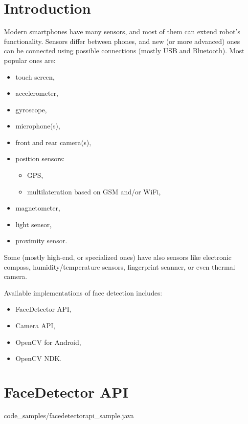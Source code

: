 \documentclass[openany]{mgr} %
\begin{document}
\section{Introduction}
Modern smartphones have many sensors, and most of them can extend robot's
functionality. Sensors differ between phones, and new (or more advanced) ones can
be connected using possible connections (mostly USB and Bluetooth).
Most popular ones are:
\begin{itemize}
  \item touch screen,
  \item accelerometer,
  \item gyroscope,
  \item microphone(s),
  \item front and rear camera(s),
  \item position sensors:
  \begin{itemize}
    \item GPS,
    \item multilateration based on GSM and/or WiFi,
  \end{itemize}
  \item magnetometer,
  \item light sensor,
  \item proximity sensor.
\end{itemize}
Some (mostly high-end, or specialized ones) have also sensors like electronic
compass, humidity/temperature sensors, fingerprint scanner, or even thermal
camera.

Available implementations of face detection includes:
\begin{itemize}
  \item FaceDetector API,
  \item Camera API,
  \item OpenCV for Android,
  \item OpenCV NDK.
\end{itemize}


\section{FaceDetector API}


{code_samples/facedetectorapi_sample.java}
\end{document}
